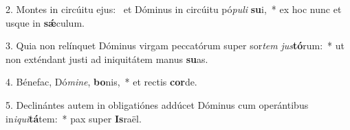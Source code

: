 2. Montes in circúitu ejus: \dag\  et Dóminus in circúitu pó\textit{pu}\textit{li} \textbf{su}i,~*  ex hoc nunc et usque in \textbf{sǽ}culum.\

3. Quia non relínquet Dóminus virgam peccatórum super sor\textit{tem} \textit{jus}\textbf{tó}rum:~*  ut non exténdant justi ad iniquitátem manus \textbf{su}as.\

4. Bénefac, Dó\textit{mi}\textit{ne}, \textbf{bo}nis,~*  et rectis \textbf{cor}de.\

5. Declinántes autem in obligatiónes addúcet Dóminus cum operántibus in\textit{i}\textit{qui}\textbf{tá}tem:~*  pax super \textbf{Is}raël.\

